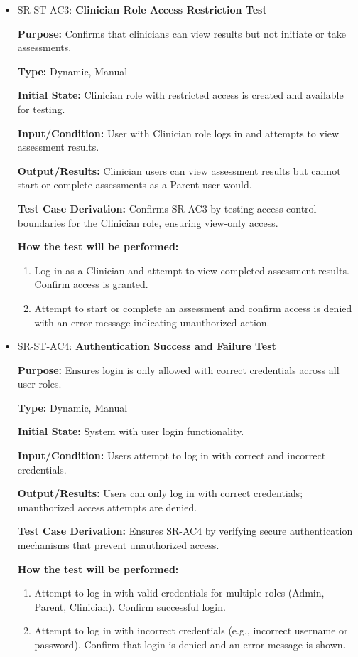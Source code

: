 \documentclass[12pt, titlepage]{article}
\begin{document}
\begin{itemize}
  \item SR-ST-AC3: \textbf{Clinician Role Access Restriction Test}
  \begin{mdframed}[linewidth=0.5mm]
      \textbf{Purpose:} Confirms that clinicians can view results but not initiate or take assessments. \par
      \textbf{Type:} Dynamic, Manual \par
      \textbf{Initial State:} Clinician role with restricted access is created and available for testing. \par
      \textbf{Input/Condition:} User with Clinician role logs in and attempts to view assessment results. \par
      \textbf{Output/Results:} Clinician users can view assessment results but cannot start or complete assessments as a Parent user would. \par
      \textbf{Test Case Derivation:} Confirms SR-AC3 by testing access control boundaries for the Clinician role, ensuring view-only access. \par
      \textbf{How the test will be performed:}
      \begin{enumerate}[noitemsep]
        \item Log in as a Clinician and attempt to view completed assessment results. Confirm access is granted.
        \item Attempt to start or complete an assessment and confirm access is denied with an error message indicating unauthorized action.
      \end{enumerate}
  \end{mdframed}

  \item SR-ST-AC4: \textbf{Authentication Success and Failure Test}
  \begin{mdframed}[linewidth=0.5mm]
      \textbf{Purpose:} Ensures login is only allowed with correct credentials across all user roles. \par
      \textbf{Type:} Dynamic, Manual \par
      \textbf{Initial State:} System with user login functionality. \par
      \textbf{Input/Condition:} Users attempt to log in with correct and incorrect credentials. \par
      \textbf{Output/Results:} Users can only log in with correct credentials; unauthorized access attempts are denied. \par
      \textbf{Test Case Derivation:} Ensures SR-AC4 by verifying secure authentication mechanisms that prevent unauthorized access. \par
      \textbf{How the test will be performed:}
      \begin{enumerate}[noitemsep]
        \item Attempt to log in with valid credentials for multiple roles (Admin, Parent, Clinician). Confirm successful login.
        \item Attempt to log in with incorrect credentials (e.g., incorrect username or password). Confirm that login is denied and an error message is shown.
      \end{enumerate}
  \end{mdframed}


\end{itemize}
\end{document}
